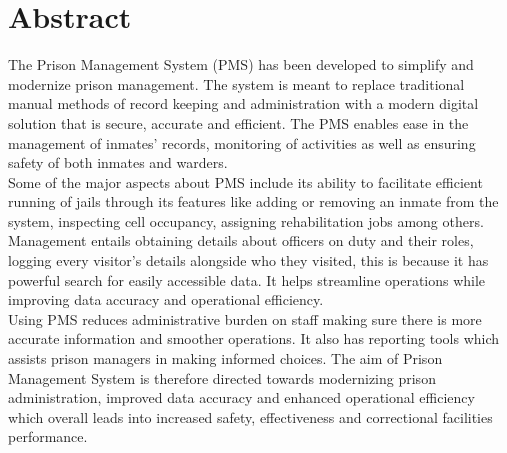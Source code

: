 \chapter*{Abstract}%
%

The Prison Management System (PMS) has been developed to simplify and modernize prison management. The system is meant to replace traditional manual methods of record keeping and administration with a modern digital solution that is secure, accurate and efficient. The PMS enables ease in the management of inmates’ records, monitoring of activities as well as ensuring safety of both inmates and warders.\\

Some of the major aspects about PMS include its ability to facilitate efficient running of jails through its features like adding or removing an inmate from the system, inspecting cell occupancy, assigning rehabilitation jobs among others. Management entails obtaining details about officers on duty and their roles, logging every visitor’s details alongside who they visited, this is because it has powerful search for easily accessible data. It helps streamline operations while improving data accuracy and operational efficiency.\\

Using PMS reduces administrative burden on staff making sure there is more accurate information and smoother operations. It also has reporting tools which assists prison managers in making informed choices. The aim of Prison Management System is therefore directed towards modernizing prison administration, improved data accuracy and enhanced operational efficiency which overall leads into increased safety, effectiveness and correctional facilities performance.\\



\thispagestyle{plain}

